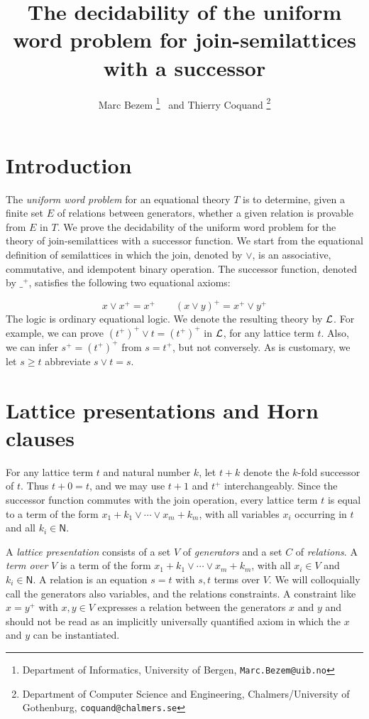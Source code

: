 \documentclass[11pt,a4paper]{article}
\newcommand{\N}{\mathsf{N}}
\newcommand\jterm[3]{{{#1_1}+{#2_1}}\vee\cdots\vee{{#1_#3}+{#2_#3}}}
\newcommand\lathy{{\cal L}}
\begin{document}
\title{The decidability of the uniform word problem
for join-semilattices with a successor}

\author{Marc Bezem%
\thanks{Department of Informatics, University of Bergen, {\tt Marc.Bezem@uib.no}}
~and Thierry Coquand
\thanks{Department of Computer Science and Engineering, 
Chalmers/University of Gothenburg, {\tt coquand@chalmers.se}}
}
\date{}


\maketitle


\section{Introduction}
The \emph{uniform word problem} for an equational theory $T$ is
to determine, given a finite set $E$ of relations between generators,
whether a given relation is provable from $E$ in $T$.
We prove the decidability of the uniform word problem for
the theory of join-semilattices with a successor function.
We start from the equational definition of semilattices in which the
join, denoted by $\vee$, is an associative, commutative, and idempotent
binary operation. The successor function, denoted by ${\_}^+$,
satisfies the following two equational axioms:

\[
x \vee x^+ = x^+ \quad \quad (x\vee y)^+ = x^+ \vee y^+
\] 
The logic is ordinary equational logic.
We denote the resulting theory by $\lathy$.
For example, we can prove $(t^+)^+ \vee t = (t^+)^+$ in $\lathy$,
for any lattice term $t$. Also, we can infer $s^+ = (t^+)^+$
from $s = t^+$, but not conversely. 
As is customary, we let $s\geq t$ abbreviate $s\vee t = s$.


\section{Lattice presentations and Horn clauses}\label{sec:latt-Horn}

For any lattice term $t$ and natural number $k$, 
let $t+k$ denote the $k$-fold successor of $t$.
Thus $t+0 = t$, and we may use $t+1$ and $t^+$ interchangeably. 
Since the successor function commutes with the join operation,
every lattice term $t$ is equal to a term of the
form $\jterm{x}{k}{m}$, with all variables $x_i$ occurring in $t$
and all $k_i\in \N$.

A \emph{lattice presentation} consists of a
set $V$ of \emph{generators} and
a set $C$ of \emph{relations}. A \emph{term over} $V$ is
a term of the form $\jterm{x}{k}{m}$, 
with all $x_i\in V$ and $k_i\in \N$.
A relation is an equation $s=t$ with $s,t$ terms over $V$.
We will colloquially call the generators also variables, and the
relations constraints. A constraint like $x=y^+$ with $x,y\in V$
expresses a relation between the generators $x$ and $y$ and 
should not be read as an implicitly universally quantified axiom
in which the $x$ and $y$ can be instantiated.
\end{document}
